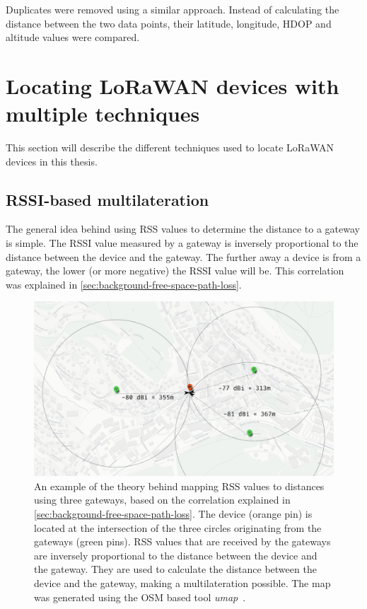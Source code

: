 Duplicates were removed using a similar approach.
Instead of calculating the distance between the two data points, their latitude, longitude, \ac{HDOP} and altitude values were compared.

\section{Locating \acs{LoRaWAN} devices with multiple techniques}

This section will describe the different techniques used to locate \ac{LoRaWAN} devices in this thesis.

\subsection{\acs{RSSI}-based multilateration}\label{sec:rssi-based-multilateration-implementation}

The general idea behind using \ac{RSS} values to determine the distance to a gateway is simple.
The \ac{RSSI} value measured by a gateway is inversely proportional to the distance between the device and the gateway.
The further away a device is from a gateway, the lower (or more negative) the \ac{RSSI} value will be.
This correlation was explained in \cref{sec:background-free-space-path-loss}.

\begin{figure}[htbp]
    \centering
    \includegraphics[width=1\textwidth]{pictures/multilateration/rssi-multilateration-example.png}
    \caption{
        An example of the theory behind mapping \ac{RSS} values to distances using three gateways, based on the correlation explained in \cref{sec:background-free-space-path-loss}.
        The device (orange pin) is located at the intersection of the three circles originating from the gateways (green pins).
        \ac{RSS} values that are received by the gateways are inversely proportional to the distance between the device and the gateway.
        They are used to calculate the distance between the device and the gateway, making a multilateration possible.
        The map was generated using the \ac{OSM} based tool \emph{umap}~\cite{noauthor_umap_nodate}.
    }\label{fig:rssi-multilateration-theoretical-example}
\end{figure}

